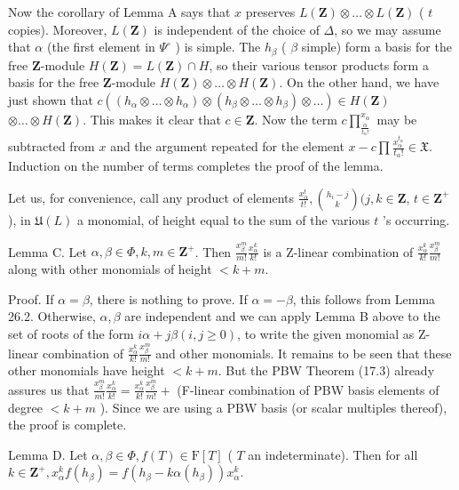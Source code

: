 \documentclass[10pt]{article}
\begin{document}
Now the corollary of Lemma A says that $x$ preserves $L(\mathbf{Z}) \otimes \ldots \otimes L(\mathbf{Z})$ ( $t$ copies). Moreover, $L(\mathbf{Z})$ is independent of the choice of $\Delta$, so we may assume that $\alpha$ (the first element in $\Psi^{\circ}$ ) is simple. The $h_{\beta}$ ( $\beta$ simple) form a basis for the free $\mathbf{Z}$-module $H(\mathbf{Z})=L(\mathbf{Z}) \cap H$, so their various tensor products form a basis for the free $\mathbf{Z}$-module $H(\mathbf{Z}) \otimes \ldots \otimes H(\mathbf{Z})$. On the other hand, we have just shown that $c\left(\left(h_{\alpha} \otimes \ldots \otimes h_{\alpha}\right) \otimes\left(h_{\beta} \otimes \ldots \otimes h_{\beta}\right) \otimes \ldots\right) \in H(\mathbf{Z})$ $\otimes \ldots \otimes H(\mathbf{Z})$. This makes it clear that $c \in \mathbf{Z}$. Now the term $c \prod_{\frac{\alpha}{t_{\alpha}!}}^{x_{\alpha}}$ may be subtracted from $x$ and the argument repeated for the element $x-c \prod \frac{x_{\alpha}^{t_{\alpha}}}{t_{\alpha}!} \in \mathfrak{X}$. Induction on the number of terms completes the proof of the lemma.

Let us, for convenience, call any product of elements $\frac{x_{\alpha}^{t}}{t!},\binom{h_{i}-j}{k}(j, k \in \mathbf{Z}$, $t \in \mathbf{Z}^{+}$), in $\mathfrak{U}(L)$ a monomial, of height equal to the sum of the various $t$ 's occurring.

Lemma C. Let $\alpha, \beta \in \Phi, k, m \in \mathbf{Z}^{+}$. Then $\frac{x_{\beta}^{m}}{m!} \frac{x_{\alpha}^{k}}{k!}$ is a Z-linear combination of $\frac{x_{\alpha}^{k}}{k!} \frac{x_{\beta}^{m}}{m!}$ along with other monomials of height $<k+m$.

Proof. If $\alpha=\beta$, there is nothing to prove. If $\alpha=-\beta$, this follows from Lemma 26.2. Otherwise, $\alpha, \beta$ are independent and we can apply Lemma B above to the set of roots of the form $i \alpha+j \beta(i, j \geq 0)$, to write the given monomial as Z-linear combination of $\frac{x_{\alpha}^{k}}{k!} \frac{x_{\beta}^{m}}{m!}$ and other monomials. It remains to be seen that these other monomials have height $<k+m$. But the PBW Theorem (17.3) already assures us that $\frac{x_{\beta}^{m}}{m!} \frac{x_{\alpha}^{k}}{k!}=\frac{x_{\alpha}^{k}}{k!} \frac{x_{\beta}^{m}}{m!}+$ (F-linear combination of PBW basis elements of degree $<k+m$ ). Since we are using a PBW basis (or scalar multiples thereof), the proof is complete.

Lemma D. Let $\alpha, \beta \in \Phi, f(T) \in \mathrm{F}[T]$ ( $T$ an indeterminate). Then for all $k \in \mathbf{Z}^{+}, x_{\alpha}^{k} f\left(h_{\beta}\right)=f\left(h_{\beta}-k \alpha\left(h_{\beta}\right)\right) x_{\alpha}^{k}$.
\end{document}
